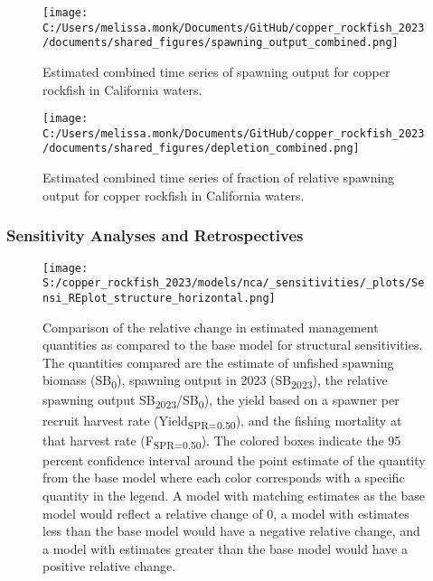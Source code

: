 \documentclass[11pt,
  english,
  letterpaper,
]{article}
\begin{document}
\pagebreak

\begin{figure}
\centering
\texttt{[image: C:/Users/melissa.monk/Documents/GitHub/copper\_rockfish\_2023/documents/shared\_figures/spawning\_output\_combined.png]}
\caption{Estimated combined time series of spawning output for copper rockfish in California waters.\label{fig:sb-all}}
\end{figure}

\clearpage

\begin{figure}
\centering
\texttt{[image: C:/Users/melissa.monk/Documents/GitHub/copper\_rockfish\_2023/documents/shared\_figures/depletion\_combined.png]}
\caption{Estimated combined time series of fraction of relative spawning output for copper rockfish in California waters.\label{fig:depl-all}}
\end{figure}

\clearpage

\hypertarget{sensitivity-analyses-and-retrospectives}{%
\subsubsection{Sensitivity Analyses and Retrospectives}\label{sensitivity-analyses-and-retrospectives}}

\begin{figure}
\centering
\texttt{[image: S:/copper\_rockfish\_2023/models/nca/\_sensitivities/\_plots/Sensi\_REplot\_structure\_horizontal.png]}
\caption{Comparison of the relative change in estimated management quantities as compared to the base model for structural sensitivities. The quantities compared are the estimate of unfished spawning biomass (SB\textsubscript{0}), spawning output in 2023 (SB\textsubscript{2023}), the relative spawning output SB\textsubscript{2023}/SB\textsubscript{0}), the yield based on a spawner per recruit harvest rate (Yield\textsubscript{SPR=0.50}), and the fishing mortality at that harvest rate (F\textsubscript{SPR=0.50}). The colored boxes indicate the 95 percent confidence interval around the point estimate of the quantity from the base model where each color corresponds with a specific quantity in the legend. A model with matching estimates as the base model would reflect a relative change of 0, a model with estimates less than the base model would have a negative relative change, and a model with estimates greater than the base model would have a positive relative change.\label{fig:sens-structure}}
\end{figure}
\end{document}
